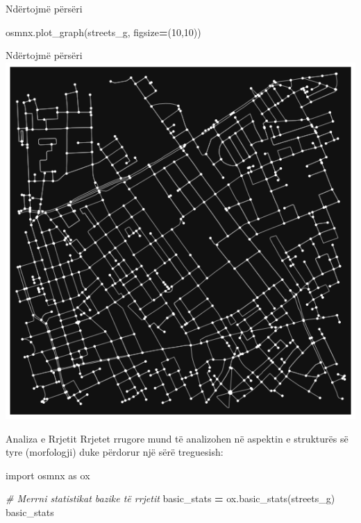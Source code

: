 \documentclass[
  ignorenonframetext,
]{beamer}
\newenvironment{Shaded}{\begin{snugshade}}{\end{snugshade}}
\newcommand{\CommentTok}[1]{\textcolor[rgb]{0.56,0.35,0.01}{\textit{#1}}}
\newcommand{\DecValTok}[1]{\textcolor[rgb]{0.00,0.00,0.81}{#1}}
\newcommand{\ImportTok}[1]{#1}
\newcommand{\NormalTok}[1]{#1}
\newcommand{\OperatorTok}[1]{\textcolor[rgb]{0.81,0.36,0.00}{\textbf{#1}}}
\begin{document}
\begin{frame}[fragile]{Ndërtojmë përsëri}
\protect\hypertarget{nduxebrtojmuxeb-puxebrsuxebri}{}

\begin{Shaded}
\begin{Highlighting}[]
\NormalTok{osmnx.plot\_graph(streets\_g, figsize}\OperatorTok{=}\NormalTok{(}\DecValTok{10}\NormalTok{,}\DecValTok{10}\NormalTok{))}
\end{Highlighting}
\end{Shaded}
\end{frame}

\begin{frame}{Ndërtojmë përsëri}
\protect\hypertarget{nduxebrtojmuxeb-puxebrsuxebri-1}{}
\includegraphics{./Figs/osmx3.png}
\end{frame}

\begin{frame}[fragile]{Analiza e Rrjetit}
\protect\hypertarget{analiza-e-rrjetit}{}
Rrjetet rrugore mund të analizohen në aspektin e strukturës së tyre
(morfologji) duke përdorur një sërë treguesish:


\begin{Shaded}
\begin{Highlighting}[]
\ImportTok{import}\NormalTok{ osmnx }\ImportTok{as}\NormalTok{ ox}

\CommentTok{\# Merrni statistikat bazike të rrjetit}
\NormalTok{basic\_stats }\OperatorTok{=}\NormalTok{ ox.basic\_stats(streets\_g)}
\NormalTok{basic\_stats}
\end{Highlighting}
\end{Shaded}
\end{frame}
\end{document}
